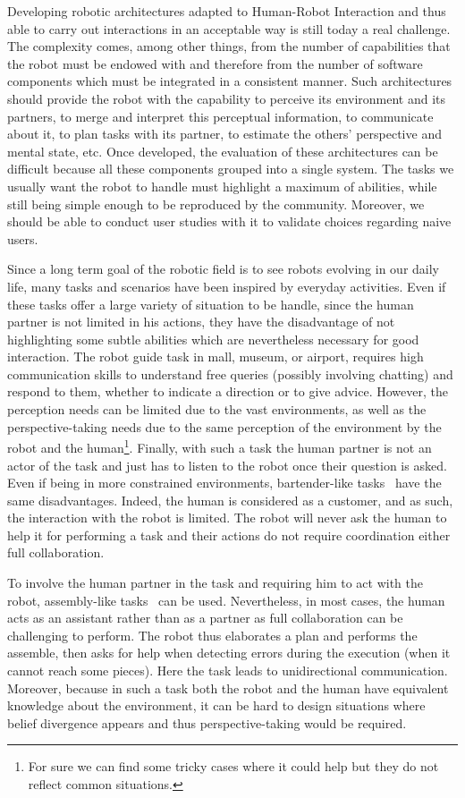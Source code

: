 \documentclass[a4paper,11pt,twoside]{StyleThese}
\begin{document}
Developing robotic architectures adapted to Human-Robot Interaction and thus able to carry out interactions in an acceptable way is still today a real challenge. The complexity comes, among other things, from the number of capabilities that the robot must be endowed with and therefore from the number of software components which must be integrated in a consistent manner. Such architectures should provide the robot with the capability to perceive its environment and its partners, to merge and interpret this perceptual information, to communicate about it, to plan tasks with its partner, to estimate the others' perspective and mental state, etc. Once developed, the evaluation of these architectures can be difficult because all these components grouped into a single system. The tasks we usually want the robot to handle must highlight a maximum of abilities, while still being simple enough to be reproduced by the community. Moreover, we should be able to conduct user studies with it to validate choices regarding naive users.

Since a long term goal of the robotic field is to see robots evolving in our daily life, many tasks and scenarios have been inspired by everyday activities. Even if these tasks offer a large variety of situation to be handle, since the human partner is not limited in his actions, they have the disadvantage of not highlighting some subtle abilities which are nevertheless necessary for good interaction.
The robot guide task \cite{satake_2015_should} in mall, museum, or airport, requires high communication skills to understand free queries (possibly involving chatting) and respond to them, whether to indicate a direction or to give advice. However, the perception needs can be limited due to the vast environments, as well as the perspective-taking needs due to the same perception of the environment by the robot and the human\footnote{For sure we can find some tricky cases where it could help but they do not reflect common situations.}. Finally, with such a task the human partner is not an actor of the task and just has to listen to the robot once their question is asked. Even if being in more constrained environments, bartender-like tasks~\cite{petrick_2012_social} have the same disadvantages. Indeed, the human is considered as a customer, and as such, the interaction with the robot is limited. The robot will never ask the human to help it for performing a task and their actions do not require coordination either full collaboration.

To involve the human partner in the task and requiring him to act with the robot, assembly-like tasks~\cite{tellex_2014_asking} can be used. Nevertheless, in most cases, the human acts as an assistant rather than as a partner as full collaboration can be challenging to perform. The robot thus elaborates a plan and performs the assemble, then asks for help when detecting errors during the execution (\eg when it cannot reach some pieces). Here the task leads to unidirectional communication. Moreover, because in such a task both the robot and the human have equivalent knowledge about the environment, it can be hard to design situations where belief divergence appears and thus perspective-taking would be required.
\end{document}
